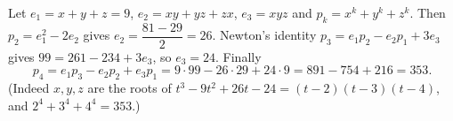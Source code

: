 Let $e_1=x+y+z=9$, $e_2=xy+yz+zx$, $e_3=xyz$ and $p_k=x^k+y^k+z^k$. Then $p_2=e_1^2-2e_2$ gives $e_2=\dfrac{81-29}{2}=26$. Newton's identity $p_3=e_1p_2-e_2p_1+3e_3$ gives $99=261-234+3e_3$, so $e_3=24$. Finally
\[p_4=e_1p_3-e_2p_2+e_3p_1=9\cdot99-26\cdot29+24\cdot9=891-754+216=\boxed{353}.\]
(Indeed $x,y,z$ are the roots of $t^3-9t^2+26t-24=(t-2)(t-3)(t-4)$, and $2^4+3^4+4^4=353$.)
